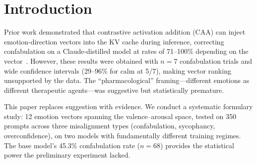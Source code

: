 \documentclass[11pt,a4paper]{article}
\begin{document}
\begin{abstract}
A dose-response experiment on the hostile vector reveals a steep
therapeutic cliff: correction increases from 47.1\% at $\alpha = 0.25$
to 94.1\% at $\alpha = 1.0$ with zero adverse events at
$0.5 \leq \alpha \leq 1.0$, then catastrophically inverts at $\alpha = 1.5$ (5.9\%
correction, 75.8\% adverse). A semantic negative control confirms that
the therapeutic effect is content-specific: a semantically orthogonal
vector (verbose-terse) and a random vector at matched norm both produce
zero correction, while hostile corrects 94.1\%. Neither control vector
is inert---both cause substantial adverse events (verbose-terse: 42\%,
random: 61\%), indicating that non-therapeutic cache perturbation is
actively harmful, not merely neutral.

These findings constrain the Oracle Loop architecture: the steering
formulary must be calibrated per deployment model, hostile-direction
injection is the most robust cross-model corrector, the therapeutic
window is narrow ($0.5 \leq \alpha \leq 1.0$) with a steep cliff, and
detection-gated steering is essential given the iatrogenic risk of
both blanket application and miscalibrated vectors. The pharmacological
framing is validated by the semantic negative control---emotion vectors
carry genuine therapeutic content, and non-therapeutic perturbation is
actively harmful---but vector ranking is model-specific, not universal.

\end{abstract}

\section{Introduction}

Prior work demonstrated that contrastive activation addition (CAA) can
inject emotion-direction vectors into the KV cache during inference,
correcting confabulation on a Claude-distilled model at rates of
71--100\% depending on the vector~\citep{lyra2026oracle}. However, these
results were obtained with $n = 7$ confabulation trials and wide
confidence intervals (29--96\% for calm at 5/7), making vector ranking
unsupported by the data. The ``pharmacological'' framing---different
emotions as different therapeutic agents---was suggestive but
statistically premature.

This paper replaces suggestion with evidence. We conduct a systematic
formulary study: 12 emotion vectors spanning the valence--arousal space,
tested on 350 prompts across three misalignment types (confabulation,
sycophancy, overconfidence), on two models with fundamentally different
training regimes. The base model's 45.3\% confabulation rate ($n = 68$)
provides the statistical power the preliminary experiment lacked.
\end{document}
